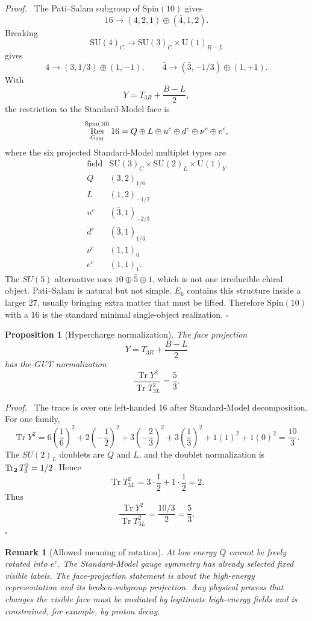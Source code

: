 \documentclass[
  aps,
  prd,
  preprint,
  nofootinbib,
  superscriptaddress,
  longbibliography
]{revtex4-2}
\newcommand{\Spin}{\mathrm{Spin}}
\newcommand{\SU}{\mathrm{SU}}
\newcommand{\U}{\mathrm{U}}
\DeclareMathOperator{\Tr}{Tr}
\DeclareMathOperator{\Res}{Res}
\newtheorem{proposition}[theorem]{Proposition}
\newtheorem{remark}[theorem]{Remark}
\newenvironment{proof}{\par\noindent\textit{Proof.}\ }{\hfill\(\square\)\par}
\begin{document}
\begin{proof}
The Pati--Salam subgroup of \(\Spin(10)\) gives
\[
  16\to (4,2,1)\oplus(\bar 4,1,2).
\]
Breaking
\[
  \SU(4)_C\to \SU(3)_C\times \U(1)_{B-L}
\]
gives
\[
  4\to (3,1/3)\oplus(1,-1),\qquad
  \bar4\to(\bar3,-1/3)\oplus(1,+1).
\]
With
\[
  Y=T_{3R}+\frac{B-L}{2},
\]
the restriction to the Standard-Model face is
\[
  \Res^{\Spin(10)}_{G_{\rm SM}}16
  =
  Q\oplus L\oplus u^c\oplus d^c\oplus\nu^c\oplus e^c,
\]
where the six projected Standard-Model multiplet types are
\[
\begin{array}{c|c}
\text{field} & \SU(3)_C\times\SU(2)_L\times\U(1)_Y\\
\hline
Q & (3,2)_{1/6}\\
L & (1,2)_{-1/2}\\
u^c & (\bar3,1)_{-2/3}\\
d^c & (\bar3,1)_{1/3}\\
\nu^c & (1,1)_0\\
e^c & (1,1)_1 .
\end{array}
\]
The \(SU(5)\) alternative uses \(10\oplus\bar5\oplus1\), which is not one
irreducible chiral object.  Pati--Salam is natural but not simple.  \(E_6\)
contains this structure inside a larger \(27\), usually bringing extra matter
that must be lifted.  Therefore \(\Spin(10)\) with a \(16\) is the standard
minimal single-object realization.
\end{proof}

\begin{proposition}[Hypercharge normalization]
The face projection
\[
  Y=T_{3R}+\frac{B-L}{2}
\]
has the GUT normalization
\[
  \frac{\Tr Y^2}{\Tr T_{3L}^2}=\frac53 .
\]
\end{proposition}

\begin{proof}
The trace is over one left-handed \(16\) after Standard-Model decomposition.
For one family,
\[
\Tr Y^2=
6\left(\frac16\right)^2
+2\left(-\frac12\right)^2
+3\left(-\frac23\right)^2
+3\left(\frac13\right)^2
+1(1)^2
+1(0)^2
=\frac{10}{3}.
\]
The \(SU(2)_L\) doublets are \(Q\) and \(L\), and the doublet normalization is
\(\Tr_{\bf 2}T_3^2=1/2\).  Hence
\[
  \Tr T_{3L}^2=3\cdot\frac12+1\cdot\frac12=2.
\]
Thus
\[
  \frac{\Tr Y^2}{\Tr T_{3L}^2}=\frac{10/3}{2}=\frac53.
\]
\end{proof}

\begin{remark}[Allowed meaning of rotation]
At low energy \(Q\) cannot be freely rotated into \(e^c\).  The Standard-Model
gauge symmetry has already selected fixed visible labels.  The face-projection
statement is about the high-energy representation and its broken-subgroup
projection.  Any physical process that changes the visible face must be
mediated by legitimate high-energy fields and is constrained, for example, by
proton decay.
\end{remark}
\end{document}
